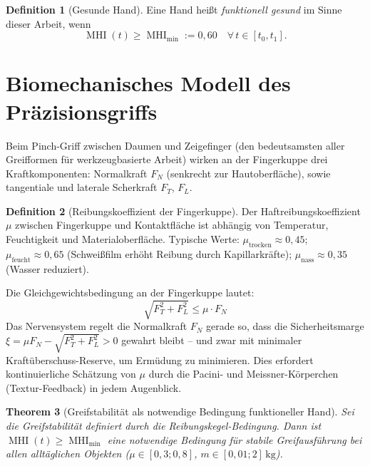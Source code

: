 ﻿\documentclass[12pt,a4paper]{report}
\theoremstyle{plain}
\newtheorem{theorem}{Theorem}[section]
\theoremstyle{definition}
\newtheorem{definition}[theorem]{Definition}
\theoremstyle{remark}
\DeclareMathOperator{\MHI}{MHI}
\begin{document}
\begin{definition}[Gesunde Hand]
\label{def:gesunde_hand}
Eine Hand heißt \emph{funktionell gesund} im Sinne dieser Arbeit, wenn
\[
  \MHI(t) \geq \MHI_{\min} := 0{,}60 \quad \forall\, t \in [t_0, t_1].
\]
\end{definition}

\section{Biomechanisches Modell des Präzisionsgriffs}

Beim Pinch-Griff zwischen Daumen und Zeigefinger (den bedeutsamsten aller
Greifformen für werkzeugbasierte Arbeit) wirken an der Fingerkuppe drei
Kraftkomponenten: Normalkraft $F_N$ (senkrecht zur Hautoberfläche),
sowie tangentiale und laterale Scherkraft $F_T$, $F_L$.

\begin{definition}[Reibungskoeffizient der Fingerkuppe]
Der Haftreibungskoeffizient $\mu$ zwischen Fingerkuppe und Kontaktfläche
ist abhängig von Temperatur, Feuchtigkeit und Materialoberfläche.
Typische Werte: $\mu_{\text{trocken}} \approx 0{,}45$;
$\mu_{\text{feucht}} \approx 0{,}65$ (Schweißfilm erhöht Reibung durch
Kapillarkräfte); $\mu_{\text{nass}} \approx 0{,}35$ (Wasser reduziert).
\end{definition}

Die Gleichgewichtsbedingung an der Fingerkuppe lautet:
\[
  \sqrt{F_T^2 + F_L^2} \leq \mu \cdot F_N
\]
Das Nervensystem regelt die Normalkraft $F_N$ gerade so, dass
die Sicherheitsmarge $\xi = \mu F_N - \sqrt{F_T^2 + F_L^2} > 0$ gewahrt
bleibt -- und zwar mit minimaler Kraftüberschuss-Reserve, um Ermüdung
zu minimieren. Dies erfordert kontinuierliche Schätzung von $\mu$ durch
die Pacini- und Meissner-Körperchen (Textur-Feedback) in jedem Augenblick.

\begin{theorem}[Greifstabilität als notwendige Bedingung funktioneller Hand]
\label{thm:greif}
Sei die Greifstabilität definiert durch die Reibungskegel-Bedingung.
Dann ist $\MHI(t) \geq \MHI_{\min}$ eine notwendige Bedingung für
stabile Greifausführung bei allen alltäglichen Objekten
($\mu \in [0{,}3; 0{,}8]$, $m \in [0{,}01; 2]\,\text{kg}$).
\end{theorem}
\end{document}
